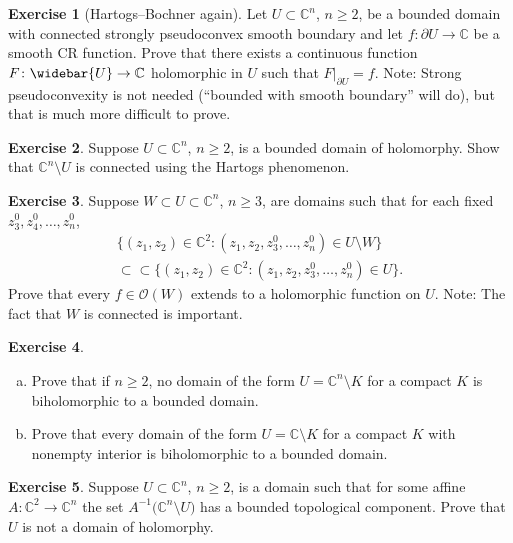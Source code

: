 \documentclass[12pt,openany]{book}
\newcommand{\C}{{\mathbb{C}}}
\newcommand{\sO}{{\mathscr{O}}}
\theoremstyle{plain}
\theoremstyle{remark}
\theoremstyle{definition}
\newenvironment{exbox}{%
    \def\FrameCommand{\vrule width 1pt \relax\hspace{10pt}}%
    \MakeFramed {\advance \hsize -\width \FrameRestore}%
}{%
    \endMakeFramed
}
\newenvironment{exparts}{%
    \leavevmode\begin{enumerate}[a),noitemsep,topsep=0pt,parsep=0pt,partopsep=0pt]
}{%
    \end{enumerate}
}
\theoremstyle{exercise}
\newtheorem{exercise}{Exercise}[section]
\theoremstyle{example}
\begin{document}
\begin{exbox}
\begin{exercise}[Hartogs--Bochner again] \label{exercise:HartogsBochnerSPCVX}
Let $U \subset \C^n$, $n \geq 2$, be a bounded domain with connected strongly
pseudoconvex smooth boundary
and let $f \colon \partial U \to \C$ be a smooth CR function.  Prove
that there exists a continuous function $F \colon \widebar{U} \to \C$
holomorphic in $U$
such that $F|_{\partial U} = f$.
Note: Strong pseudoconvexity is not needed (``bounded with smooth boundary''
will do), but that is much more difficult to prove.
\end{exercise}

\begin{exercise}
Suppose $U \subset \C^n$, $n \geq 2$, is a bounded domain of
holomorphy.  Show that $\C^n \setminus U$ is connected using the
Hartogs phenomenon.
\end{exercise}

\begin{exercise}
Suppose $W \subset U \subset \C^n$, $n \geq 3$, are domains such that
for each fixed $z_3^0,z_4^0,\ldots,z_n^0$,
\begin{multline*}
\bigl\{ (z_1,z_2) \in \C^2 :
(z_1,z_2,z_3^0,\ldots,z_n^0) \in U \setminus W
\bigr\}
\\
\subset \subset
\bigl\{ (z_1,z_2) \in \C^2 :
(z_1,z_2,z_3^0,\ldots,z_n^0) \in U
\bigr\} .
\end{multline*}
Prove that every $f \in \sO(W)$ extends to a holomorphic function on
$U$.  Note: The fact that $W$ is connected is important.
\end{exercise}

\begin{exercise}
\begin{exparts}
\item
Prove that if $n \geq 2$, no domain of the form $U = \C^n \setminus K$
for a compact $K$ is biholomorphic to a bounded domain.
\item
Prove that every domain of the form $U = \C \setminus K$
for a compact $K$ with nonempty interior is biholomorphic to a bounded domain.
\end{exparts}
\end{exercise}

\begin{exercise}
Suppose $U \subset \C^n$, $n \geq 2$, is a domain such that
for some affine $A \colon \C^2 \to \C^n$
the set $A^{-1}\bigl(\C^n \setminus U\bigr)$ has a bounded
topological component.  Prove that $U$ is not a domain of holomorphy.
\end{exercise}
\end{exbox}
\end{document}
